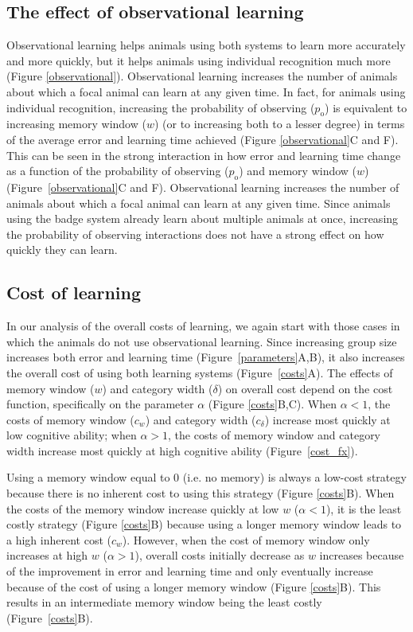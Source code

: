\subsection*{The effect of observational learning}
Observational learning helps animals using both systems to learn more accurately and more quickly, but it helps animals using individual recognition much more (Figure \ref{observational}). Observational learning increases the number of animals about which a focal animal can learn at any given time. In fact, for animals using individual recognition, increasing the probability of observing ($p_\text{o}$) is equivalent to increasing memory window ($w$) (or to increasing both to a lesser degree) in terms of the average error and learning time achieved (Figure \ref{observational}C and F). This can be seen in the strong interaction in how error and learning time change as a function of the probability of observing ($p_\text{o}$) and memory window ($w$) (Figure~\ref{observational}C and F).
Observational learning increases the number of animals about which a focal animal can learn at any given time. Since animals using the badge system already learn about multiple animals at once, increasing the probability of observing interactions does not have a strong effect on how quickly they can learn.

%
\subsection*{Cost of learning} 
In our analysis of the overall costs of learning, we again start with those cases in which the animals do not use observational learning. Since increasing group size increases both error and learning time (Figure~\ref{parameters}A,B), it also increases the overall cost of using both learning systems (Figure~\ref{costs}A). The effects of memory window ($w$) and category width ($\delta$) on overall cost depend on the cost function, specifically on the parameter $\alpha$ (Figure \ref{costs}B,C). When $\alpha<1$, the costs of memory window ($c_w$) and category width ($c_\delta$) increase most quickly at low cognitive ability; when $\alpha>1$, the costs of memory window and category width increase most quickly at high cognitive ability (Figure~\ref{cost_fx}). 

Using a memory window equal to $0$ (i.e. no memory) is always a low-cost strategy because there is no inherent cost to using this strategy (Figure \ref{costs}B). When the costs of the memory window increase quickly at low $w$ ($\alpha<1$), it is the least costly strategy (Figure \ref{costs}B) because using a longer memory window leads to a high inherent cost ($c_w$). However, when the cost of memory window only increases at high $w$ ($\alpha>1$), overall costs initially decrease as $w$ increases because of the improvement in error and learning time and only eventually increase because of the cost of using a longer memory window (Figure \ref{costs}B). This results in an intermediate memory window being the least costly (Figure~\ref{costs}B).


